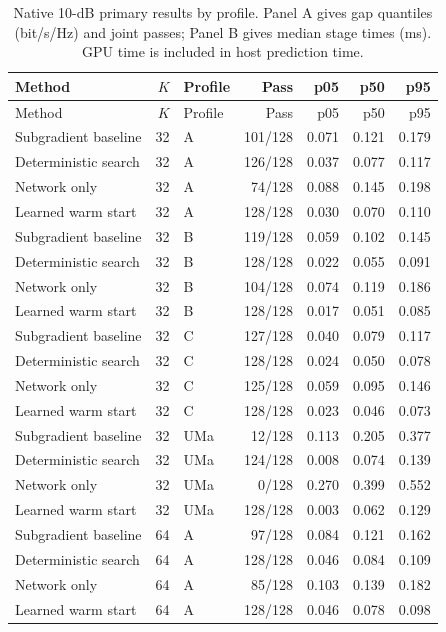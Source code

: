 \begingroup\small\setlength{\tabcolsep}{4pt}
\begin{longtable}{lrlrrrr}\caption{Native 10-dB primary results by profile. Panel A gives gap quantiles (bit/s/Hz) and joint passes; Panel B gives median stage times (ms). GPU time is included in host prediction time.}\label{supp:table3}\\
\toprule Method & $K$ & Profile & Pass & p05 & p50 & p95\\\midrule\endfirsthead\toprule Method & $K$ & Profile & Pass & p05 & p50 & p95\\\midrule\endhead\bottomrule\endfoot
Subgradient baseline & 32 & A & 101/128 & 0.071 & 0.121 & 0.179\\
Deterministic search & 32 & A & 126/128 & 0.037 & 0.077 & 0.117\\
Network only & 32 & A & 74/128 & 0.088 & 0.145 & 0.198\\
Learned warm start & 32 & A & 128/128 & 0.030 & 0.070 & 0.110\\
Subgradient baseline & 32 & B & 119/128 & 0.059 & 0.102 & 0.145\\
Deterministic search & 32 & B & 128/128 & 0.022 & 0.055 & 0.091\\
Network only & 32 & B & 104/128 & 0.074 & 0.119 & 0.186\\
Learned warm start & 32 & B & 128/128 & 0.017 & 0.051 & 0.085\\
Subgradient baseline & 32 & C & 127/128 & 0.040 & 0.079 & 0.117\\
Deterministic search & 32 & C & 128/128 & 0.024 & 0.050 & 0.078\\
Network only & 32 & C & 125/128 & 0.059 & 0.095 & 0.146\\
Learned warm start & 32 & C & 128/128 & 0.023 & 0.046 & 0.073\\
Subgradient baseline & 32 & UMa & 12/128 & 0.113 & 0.205 & 0.377\\
Deterministic search & 32 & UMa & 124/128 & 0.008 & 0.074 & 0.139\\
Network only & 32 & UMa & 0/128 & 0.270 & 0.399 & 0.552\\
Learned warm start & 32 & UMa & 128/128 & 0.003 & 0.062 & 0.129\\
Subgradient baseline & 64 & A & 97/128 & 0.084 & 0.121 & 0.162\\
Deterministic search & 64 & A & 128/128 & 0.046 & 0.084 & 0.109\\
Network only & 64 & A & 85/128 & 0.103 & 0.139 & 0.182\\
Learned warm start & 64 & A & 128/128 & 0.046 & 0.078 & 0.098\\

\end{longtable}
